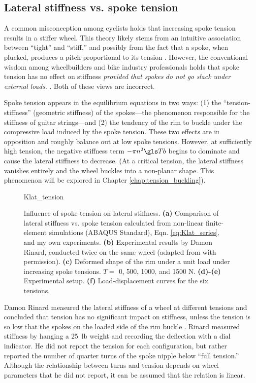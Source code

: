 \documentclass[\rootdir/thesis.tex]{subfiles}
\begin{document}
\subsection{Lateral stiffness vs. spoke tension}
\label{sec:Klat_tension}

A common misconception among cyclists holds that increasing spoke tension results in a stiffer wheel. This theory likely stems from an intuitive association between ``tight'' and ``stiff,'' and possibly from the fact that a spoke, when plucked, produces a pitch proportional to its tension \cite{Allen1997}. However, the conventional wisdom among wheelbuilders and bike industry professionals holds that spoke tension has no effect on stiffness \emph{provided that spokes do not go slack under external loads.} \cite{Rinard,Kopecky2013,Hjertberg2014,Glaskin2015}. Both of these views are incorrect.

Spoke tension appears in the equilibrium equations in two ways: (1) the ``tension-stiffness'' (geometric stiffness) of the spokes---the phenomenon responsible for the stiffness of guitar strings---and (2) the tendency of the rim to buckle under the compressive load induced by the spoke tension. These two effects are in opposition and roughly balance out at low spoke tensions. However, at sufficiently high tension, the negative stiffness term $-\pi n^2 \Tb$ begins to dominate and cause the lateral stiffness to decrease. (At a critical tension, the lateral stiffness vanishes entirely and the wheel buckles into a non-planar shape. This phenomenon will be explored in Chapter \ref{chap:tension_buckling}).

\begin{figure}[t]
\centering
{Klat_tension}
\caption[Influence of spoke tension on lateral stiffness]{Influence of spoke tension on lateral stiffness. \textbf{(a)} Comparison of lateral stiffness vs. spoke tension calculated from non-linear finite-element simulations (ABAQUS Standard), Eqn. \eqref{eq:Klat_series}, and my own experiments. \textbf{(b)} Experimental results by Damon Rinard, conducted twice on the same wheel (adapted from \cite{Rinard} with permission). \textbf{(c)} Deformed shape of the rim under a unit load under increasing spoke tensions. $T=\,\,$0, 500, 1000, and 1500 \si{N}. \textbf{(d)-(e)} Experimental setup. \textbf{(f)} Load-displacement curves for the six tensions.}
\label{fig:Klat_tension}
\end{figure}

Damon Rinard measured the lateral stiffness of a wheel at different tensions and concluded that tension has no significant impact on stiffness, unless the tension is so low that the spokes on the loaded side of the rim buckle \cite{Rinard}. Rinard measured stiffness by hanging a \SI{25}{lb} weight and recording the deflection with a dial indicator. He did not report the tension for each configuration, but rather reported the number of quarter turns of the spoke nipple below ``full tension.'' Although the relationship between turns and tension depends on wheel parameters that he did not report, it can be assumed that the relation is linear.
\end{document}
